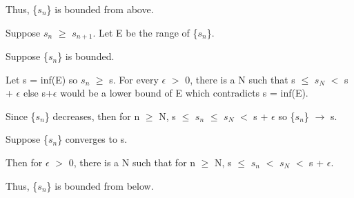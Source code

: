 	Thus, \{$s_n$\} is bounded from above.

	\vspace{0.2cm}

	Suppose $s_n$ $\geq$ $s_{n+1}$. Let E be the range of \{$s_n$\}.

	Suppose \{$s_n$\} is bounded.

	Let s = inf(E) so $s_n$ $\geq$ s.
	For every $\epsilon$ $>$ 0, there is a N such that
	s $\leq$ $s_N$ $<$ s + $\epsilon$
	else s+$\epsilon$ would be a lower bound of E
	which contradicts s = inf(E).

	Since \{$s_n$\} decreases, then for n $\geq$ N,
	s $\leq$ $s_n$ $\leq$ $s_N$ $<$ s + $\epsilon$
	so \{$s_n$\} $\rightarrow$ s.
	
	Suppose \{$s_n$\} converges to s.

	Then for $\epsilon$ $>$ 0, there is a N such that for n $\geq$ N,
	s $\leq$ $s_n$ $<$ $s_N$ $<$ s + $\epsilon$.

	Thus, \{$s_n$\} is bounded from below. \\
	




